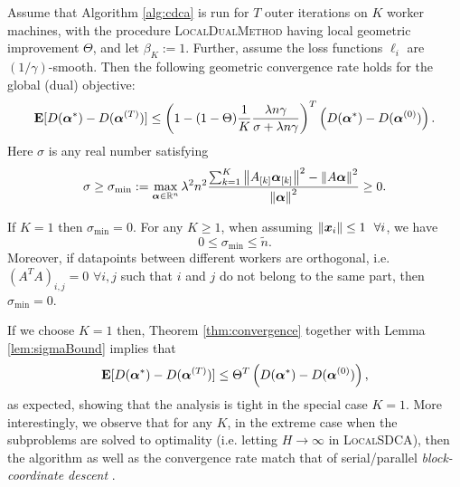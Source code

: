 \documentclass{article} %
\newcommand{\localalgname}{\textsc{LocalDualMethod}\xspace}
\newcommand{\localSDCA}{\textsc{LocalSDCA}\xspace}
\begin{document}

\begin{theorem}\label{thm:convergence}
Assume that Algorithm \ref{alg:cdca} is run for $T$ outer iterations on $K$ worker machines, 
with the procedure \localalgname having local geometric improvement $\Theta$, and let $\beta_K:=1$.
Further, assume the loss functions $\ell_i$ are $(1/\gamma)$-smooth.
Then the following geometric convergence rate holds for the global (dual) objective:
\begin{equation}\label{eq:convergenceResult}
\operatorname*{\mathbf{E}}[D(\bm{\alpha}^*) - D(\bm{\alpha}^{(T)})]
\leq 
\left(1-(1-\Theta)
 \frac1K
  \frac{\lambda n \gamma }{\sigma
   + \lambda n \gamma }
\right)^T     \left(D(\bm{\alpha}^*) - D(\bm{\alpha}^{(0)})\right).
\end{equation}
Here $\sigma$ is any real number satisfying
\begin{align}\label{eq:sigma}
 \sigma
\geq%
\sigma_{\min} := \max_{\av \in \R^n}
\lambda^2 n^2 %
\frac{ \textstyle{\sum}_{k=1}^K   
  \norm{ A_{[k]}   \av_{[k]} }^2  -
  \norm{ A \av }^2 
   }
   {\norm{ \av }^2   } \geq 0.
\end{align}
\end{theorem}
\begin{lemma}\label{lem:sigmaBound}
If $K=1$ then $\sigma_{\min}=0$.
For any $K\geq 1$, when assuming $\|\bm{x}_i\|\leq 1 \ \ \forall i$, we have 
\[
0 \le \sigma_{\min} \le \tilde n .
\]
Moreover, if datapoints between different workers are orthogonal, i.e. $(A^TA)_{i,j} = 0$ $\forall i,j$ such that $i$ and $j$ do not belong to the same part, then $\sigma_{\min}=0$.
\end{lemma}
If we choose $K=1$ then, Theorem \ref{thm:convergence} together with Lemma \ref{lem:sigmaBound} implies that
\[
\operatorname*{\mathbf{E}}[D(\bm{\alpha}^*) - D(\bm{\alpha}^{(T)})]
\leq 
\Theta^T     \left(D(\bm{\alpha}^*) - D(\bm{\alpha}^{(0)})\right),
\]
as expected, showing that the analysis is tight in the special case $K=1$. 
More interestingly, we observe that for any $K$, in the extreme case when the subproblems are solved to optimality
(i.e. letting $H\to \infty$ in \localSDCA), then the algorithm as well as the convergence rate match
that of serial/parallel \emph{block-coordinate descent} \cite{Richtarik:2014fe,Richtarik:2012vf}.
\end{document}
